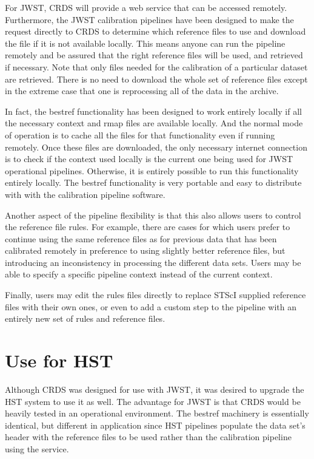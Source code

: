 \documentclass[final,authoryear,5p,times,twocolumn]{elsarticle}
\begin{document}
For JWST, CRDS will provide a web service that can be accessed
remotely. Furthermore, the JWST calibration pipelines have been designed to
make the request directly to CRDS to determine which reference files to use and
download the file if it is not available locally. This means anyone can run the
pipeline remotely and be assured that the right reference files will be used,
and retrieved if necessary. Note that only files needed for the calibration
of a particular dataset are retrieved. There is no need to download the whole
set of reference files except in the extreme case that one is reprocessing all
of the data in the archive.

In fact, the bestref functionality has been designed to work entirely locally
if all the necessary context and rmap files are available locally. And the
normal mode of operation is to cache all the files for that functionality even
if running remotely. Once these files are downloaded, the only necessary
internet connection is to check if the context used locally is the current one
being used for JWST operational pipelines. Otherwise, it is entirely possible
to run this functionality entirely locally. The bestref functionality is very
portable and easy to distribute with with the calibration pipeline software.

Another aspect of the pipeline flexibility is that this also allows users to
control the reference file rules. For example, there are cases for which users
prefer to continue using the same reference files as for previous data that has
been calibrated remotely in preference to using slightly better reference
files, but introducing an inconsistency in processing the different data
sets. Users may be able to specify a specific pipeline context instead of the
current context.

Finally, users may edit the rules files directly to replace STScI supplied
reference files with their own ones, or even to add a custom step to the
pipeline with an entirely new set of rules and reference files.

\section{Use for HST}
\label{sec:HST}

Although CRDS was designed for use with JWST, it was desired to upgrade the HST
system to use it as well. The advantage for JWST is that CRDS would be heavily
tested in an operational environment. The bestref machinery is essentially
identical, but different in application since HST pipelines populate the data
set's header with the reference files to be used rather than the calibration
pipeline using the service.
\end{document}

